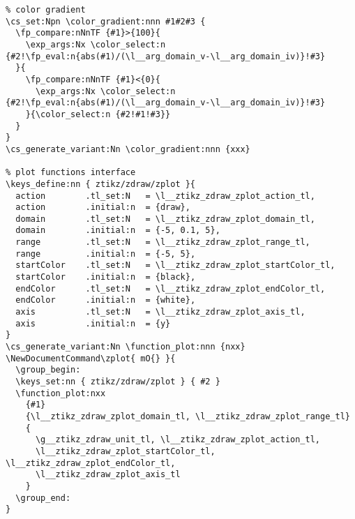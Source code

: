 \begin{verbatim}
% color gradient
\cs_set:Npn \color_gradient:nnn #1#2#3 {
  \fp_compare:nNnTF {#1}>{100}{
    \exp_args:Nx \color_select:n {#2!\fp_eval:n{abs(#1)/(\l__arg_domain_v-\l__arg_domain_iv)}!#3} 
  }{
    \fp_compare:nNnTF {#1}<{0}{
      \exp_args:Nx \color_select:n {#2!\fp_eval:n{abs(#1)/(\l__arg_domain_v-\l__arg_domain_iv)}!#3} 
    }{\color_select:n {#2!#1!#3}}
  }
}
\cs_generate_variant:Nn \color_gradient:nnn {xxx}

% plot functions interface
\keys_define:nn { ztikz/zdraw/zplot }{
  action        .tl_set:N   = \l__ztikz_zdraw_zplot_action_tl,
  action        .initial:n  = {draw},
  domain        .tl_set:N   = \l__ztikz_zdraw_zplot_domain_tl,
  domain        .initial:n  = {-5, 0.1, 5},
  range         .tl_set:N   = \l__ztikz_zdraw_zplot_range_tl,
  range         .initial:n  = {-5, 5},
  startColor    .tl_set:N   = \l__ztikz_zdraw_zplot_startColor_tl,
  startColor    .initial:n  = {black},
  endColor      .tl_set:N   = \l__ztikz_zdraw_zplot_endColor_tl,
  endColor      .initial:n  = {white},
  axis          .tl_set:N   = \l__ztikz_zdraw_zplot_axis_tl,
  axis          .initial:n  = {y}
}
\cs_generate_variant:Nn \function_plot:nnn {nxx}
\NewDocumentCommand\zplot{ mO{} }{
  \group_begin:
  \keys_set:nn { ztikz/zdraw/zplot } { #2 }
  \function_plot:nxx
    {#1}
    {\l__ztikz_zdraw_zplot_domain_tl, \l__ztikz_zdraw_zplot_range_tl}
    {
      \g__ztikz_zdraw_unit_tl, \l__ztikz_zdraw_zplot_action_tl, 
      \l__ztikz_zdraw_zplot_startColor_tl, \l__ztikz_zdraw_zplot_endColor_tl,
      \l__ztikz_zdraw_zplot_axis_tl
    }
  \group_end:
}
\end{verbatim}



